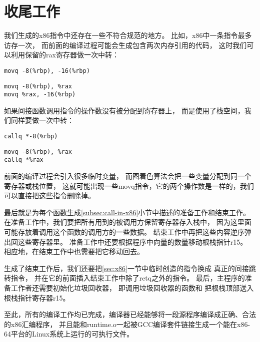 
\section{收尾工作}

我们生成的x86指令中还存在一些不符合规范的地方。
比如，x86中一条指令最多访存一次，
而前面的编译过程可能会生成包含两次内存引用的代码，
这时我们可以利用保留的rax寄存器做一次中转：

\begin{transformation}
\begin{lstlisting}
movq -8(%rbp), -16(%rbp)
\end{lstlisting}
\compilesto
\begin{lstlisting}
movq -8(%rbp), %rax
movq %rax, -16(%rbp)
\end{lstlisting}
\end{transformation}

如果间接函数调用指令的操作数没有被分配到寄存器上，
而是使用了栈空间，我们同样要做一次中转：
\begin{transformation}
\begin{lstlisting}
callq *-8(%rbp)
\end{lstlisting}
\compilesto
\begin{lstlisting}
movq -8(%rbp), %rax
callq *%rax
\end{lstlisting}
\end{transformation}

前面的编译过程会引入很多临时变量，
而图着色算法会把一些变量分配到同一个寄存器或栈位置，
这就可能出现一些movq指令，它的两个操作数是一样的，我们可以直接把这些指令删除掉。

最后就是为每个函数生成\ref{subsec:call-in-x86}小节中描述的准备工作和结束工作。
在准备工作中，我们要把所有用到的被调用方保留寄存器存入栈中，
因为这里面可能存放着调用这个函数的调用方的一些数据。
结束工作中再把这些内容逆序弹出回这些寄存器里。
准备工作中还要根据程序中向量的数量移动根栈指针r15。
相应地，在结束工作中也需要把它移动回去。

生成了结束工作后，我们还要把\ref{sec:x86}一节中临时创造的指令换成
真正的间接跳转指令，
并在它的前面插入结束工作中除了retq之外的指令。
最后，主程序的准备工作者还需要初始化垃圾回收器，
即调用垃圾回收器的函数和
把根栈顶部送入根栈指针寄存器r15。

至此，所有的编译工作均已完成，编译器已经能够将一段源程序编译成正确、合法的x86汇编程序，
并且能和runtime.o一起被GCC编译套件链接生成一个能在x86-64平台的Linux系统上运行的可执行文件。

